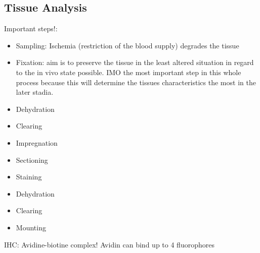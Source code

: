 \documentclass{article}
\begin{document}
\subsection{Tissue Analysis}

Important steps!:
\begin{itemize}
    \item Sampling: Ischemia (restriction of the blood supply) degrades the tissue
    \item Fixation: aim is to preserve the tissue in the least altered situation in regard to the in vivo state possible. IMO the most important step in this whole process because this will determine the tissues characteristics the most in the later stadia.
    \item Dehydration
    \item Clearing
    \item Impregnation
    \item Sectioning
    \item Staining
    \item Dehydration
    \item Clearing
    \item Mounting
\end{itemize}

IHC: Avidine-biotine complex! Avidin can bind up to 4 fluorophores
\end{document}
